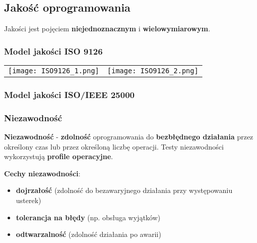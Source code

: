 \documentclass[../main.tex]{subfiles}
\begin{document}
    \subsection{Jakość oprogramowania}
    Jakości jest pojęciem \textbf{niejednoznacznym} i \textbf{wielowymiarowym}.

    \subsubsection{Model jakości ISO 9126}

    \begin{table}[H]
        \begin{center}
            \begin{tabular}{ p{8cm} p{8cm}}
                \texttt{[image: ISO9126\_1.png]}
                &
                \texttt{[image: ISO9126\_2.png]}
            \end{tabular}
        \end{center}
    \end{table}

    \subsubsection{Model jakości ISO/IEEE 25000}

    \subsubsection{Niezawodność}

    \textbf{Niezawodność} - \textbf{zdolność} oprogramowania do \textbf{bezbłędnego działania} przez określony czas lub przez określoną
    liczbę operacji. Testy niezawodności wykorzystują \textbf{profile operacyjne}.

    \textbf{Cechy niezawodności}:
    \begin{itemize}
        \item \textbf{dojrzałość} (zdolność do bezawaryjnego działania przy występowaniu usterek)
        \item \textbf{tolerancja na błędy} (np. obsługa wyjątków)
        \item \textbf{odtwarzalność} (zdolność działania po awarii)
    \end{itemize}
\end{document}

